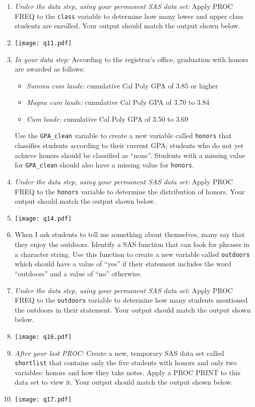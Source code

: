\begin{enumerate}
\item  \emph{Under the data step, using your permanent SAS data set:}  Apply PROC FREQ to the \texttt{class} variable to determine how many lower and upper class students are enrolled.  Your output should match the output shown below.
    \item[]\texttt{[image: q11.pdf]}
\item \emph{In your data step:}  According to the registrar's office, graduation with honors are awarded as follows:
\begin{itemize}
\item \emph{Summa cum laude:} cumulative Cal Poly GPA of 3.85 or higher
\item \emph{Magna cum laude:} cumulative Cal Poly GPA of 3.70 to 3.84
\item \emph{Cum laude:} cumulative Cal Poly GPA of 3.50 to 3.69
\end{itemize}
Use the \texttt{GPA\_clean} variable to create a new variable called \texttt{honors} that classifies students according to their current GPA; students who do not yet achieve honors should be classified as ``none''.  Students with a missing value for \texttt{GPA\_clean} should also have a missing value for \texttt{honors}.
\item \emph{Under the data step, using your permanent SAS data set:}  Apply PROC FREQ to the \texttt{honors} variable to determine the distribution of honors.  Your output should match the output shown below.
\item[]\texttt{[image: q14.pdf]}
\item When I ask students to tell me something about themselves, many say that they enjoy the outdoors.  Identify a SAS function that can look for phrases in a character string.  Use this function to create a new variable called \texttt{outdoors} which should have a value of ``yes'' if their statement includes the word ``outdoors'' and a value of ``no'' otherwise.
\item \emph{Under the data step, using your permanent SAS data set:}  Apply PROC FREQ to the \texttt{outdoors} variable to determine how many students mentioned the outdoors in their statement.  Your output should match the output shown below.
\item[]\texttt{[image: q16.pdf]}
\item \emph{After your last PROC:} Create a new, temporary SAS data set called \texttt{shortlist} that contains only the five students with honors and only two variables: honors and how they take notes.  Apply a PROC PRINT to this data set to view it.  Your output should match the output shown below.
\item[]\texttt{[image: q17.pdf]}
\end{enumerate}

 